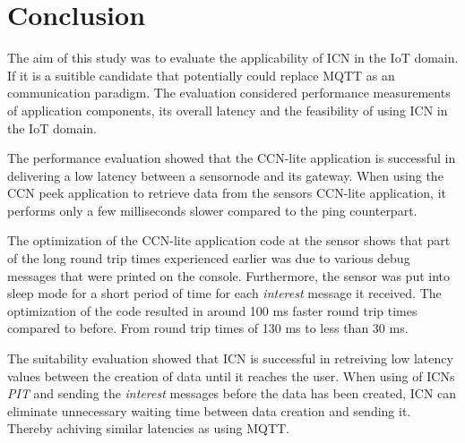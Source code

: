 \section{Conclusion}

%
%

The aim of this study was to evaluate the applicability of ICN in the IoT domain. If it is a suitible candidate that potentially could replace MQTT as an communication paradigm.
The evaluation considered performance measurements of application components, its overall latency and the feasibility of using ICN in the IoT domain.

The performance evaluation showed that the CCN-lite application is successful in delivering a low latency between a sensornode and its gateway. 
When using the CCN peek application to retrieve data from the sensors CCN-lite application, it performs only a few milliseconds slower compared to the ping counterpart.

The optimization of the CCN-lite application code at the sensor shows that part of the long round trip times experienced earlier was due to various debug messages that were printed on the console. Furthermore, the sensor was put into sleep mode for a short period of time for each \textit{interest} message it received. The optimization of the code resulted in around 100 ms faster round trip times compared to before. From round trip times of 130 ms to less than 30 ms.

The suitability evaluation showed that ICN is successful in retreiving low latency values between the creation of data until it reaches the user. When using of ICNs \textit{PIT} and sending the \textit{interest} messages before the data has been created, ICN can eliminate unnecessary waiting time between data creation and sending it. Thereby achiving similar latencies as using MQTT.

